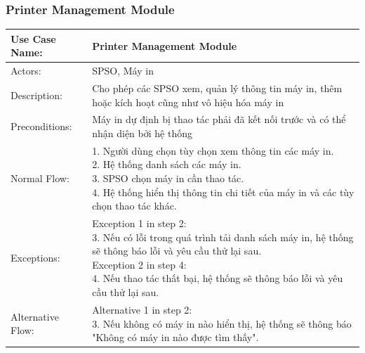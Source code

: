 \subsubsection{Printer Management Module}
\begin{table}[h!]
	\centering
	\begin{tabular}{ |p{4cm}|p{3cm}|p{3cm}|p{3cm}|  }
		\hline
		Use Case Name:    & \multicolumn{3}{l|}{Printer Management Module}                                                               \\
		\hline
		Actors:           & \multicolumn{3}{p{10cm}|}{SPSO, Máy in}                                                                      \\
		\hline
		Description:      & \multicolumn{3}{p{10cm}|}{Cho phép các SPSO xem, quản lý thông tin máy in,
		thêm hoặc kích hoạt cũng như vô hiệu hóa máy in}                                                                                 \\
		\hline
		Preconditions:    & \multicolumn{3}{p{10cm}|}{Máy in dự định bị thao tác phải đã kết nối trước và có thể nhận diện bởi hệ thống} \\
		\hline
		Normal Flow:      & \multicolumn{3}{p{10cm}|}{
			1. Người dùng chọn tùy chọn xem thông tin các máy in.\newline
			2. Hệ thống danh sách các máy in.\newline
			3. SPSO chọn máy in cần thao tác.\newline
			4. Hệ thống hiển thị thông tin chi tiết của máy in và các tùy chọn thao tác khác.
		}                                                                                                                                \\
		\hline
		Exceptions:       & \multicolumn{3}{p{10cm}|}{
			Exception 1 in step 2:\newline
			3. Nếu có lỗi trong quá trình tải danh sách máy in, hệ thống sẽ thông báo lỗi và yêu cầu thử lại sau.\newline
			Exception 2 in step 4:\newline
			4. Nếu thao tác thất bại, hệ thống sẽ thông báo lỗi và yêu cầu thử lại sau.
		}                                                                                                                                \\
		\hline
		Alternative Flow: & \multicolumn{3}{p{10cm}|}{
			Alternative 1 in step 2:\newline
			3. Nếu không có máy in nào hiển thị, hệ thống sẽ thông báo "Không có máy in nào được tìm thấy".\newline
}
\end{tabular}
\end{table}
